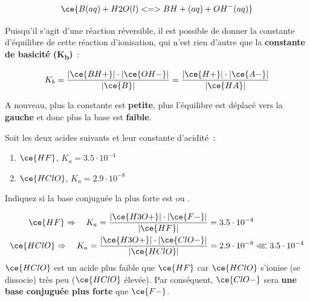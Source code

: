 \documentclass[
  11pt,
  french,
  a4paper,
  openany]{book}
\providecommand{\tightlist}{%
  \setlength{\itemsep}{0pt}\setlength{\parskip}{0pt}}
\begin{document}
\[
\ce{B(aq) + H2O(l) <=> BH+(aq) + OH^{-}(aq)}
\]

Puisqu'il s'agit d'une réaction réversible, il est possible de donner la constante d'équilibre de cette réaction d'ionisation, qui n'est rien d'autre que la \textbf{constante de basicité (K\textsubscript{b})}~:

\[
K_b = \frac{|\ce{BH+}| \cdot |\ce{OH-}|}{|\ce{B}|} =  \frac{|\ce{H+}| \cdot |\ce{A-}|}{|\ce{HA}|}
\]

A nouveau, plus la constante est \textbf{petite}, plus l'équilibre est déplacé vers la \textbf{gauche} et donc plus la base est \textbf{faible}.

\begin{Exercise}
Soit les deux acides suivants et leur constante d'acidité~:

\begin{enumerate}
\def\labelenumi{\alph{enumi}.}
\tightlist
\item
  \(\ce{HF}\), \(K_a = 3.5 \cdot 10^{-4}\)
\item
  \(\ce{HClO}\), \(K_a = 2.9 \cdot 10^{-8}\)
\end{enumerate}

Indiquez si la base conjuguée la plus forte est  ou .

\end{Exercise}

\begin{Answer}
\[
\begin{split}
  \ce{HF} \Rightarrow \quad K_a = \frac{|\ce{H3O+}| \cdot |\ce{F-}|}{|\ce{HF}|} &= 3.5 \cdot 10^{-4} \\
  \ce{HClO} \Rightarrow \quad K_a = \frac{|\ce{H3O+}| \cdot |\ce{ClO-}|}{|\ce{HClO}|} &= 2.9 \cdot 10^{-8} \lll 3.5 \cdot 10^{-4}
\end{split}
\]
\(\ce{HClO}\) est un acide plus faible que \(\ce{HF}\) car \(\ce{HClO}\) s'ionise (se dissocie) très peu (\textbar{}\(\ce{HClO}\)\textbar{} élevée). Par conséquent, \(\ce{ClO-}\) sera \textbf{une base conjuguée plus forte} que \(\ce{F-}\).

\end{Answer}

\clearpage
\end{document}
